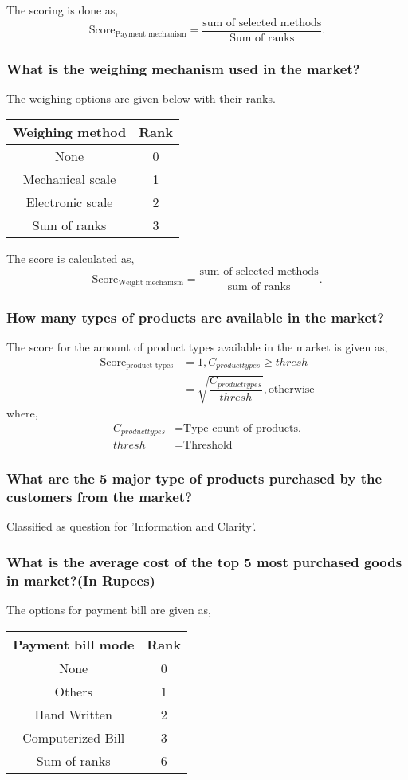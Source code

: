 \documentclass[oneside,twocolumn]{article}
\newcommand{\tsub}[2]{\text{#1}_{\text{#2}}}
\newenvironment{ttable}
               {\begin{center}
                 \begin{tabular}{c|c}
                   \hline
                   }
                   { \\ \hline
                 \end{tabular}
               \end{center}
               }
\begin{document}
The scoring is done as,
\[
\text{Score}_{\text{Payment mechanism}} = \dfrac{\text{sum of selected methods}}{\text{Sum of ranks}}.
\]

\subsubsection{What is the weighing mechanism used in the market?}
The weighing options are given below with their ranks.
\begin{center}
  \begin{tabular}{c|c}
    \hline
    Weighing method & Rank \\ \hline
    None & 0 \\
    Mechanical scale & 1 \\
    Electronic scale & 2 \\ \hline
    Sum of ranks & 3 \\ \hline
  \end{tabular}
\end{center}

The score is calculated as,
\[
\text{Score}_{\text{Weight mechanism}} = \dfrac{\text{sum of selected methods}}{\text{sum of ranks}}.
\]

\subsubsection{How many types of products are available in the market?}
The score for the amount of product types available in the market is
given as,
\begin{align*}
  \tsub{Score}{product types} &= 1, C_{product types} \ge thresh \\
  &= \sqrt{\dfrac{C_{product types}}{thresh}}, \text{otherwise}
\end{align*}
where,
\begin{align*}
  C_{product types} &= \text{Type count of products.} \\
  thresh &= \text{Threshold}
\end{align*}

\subsubsection{What are the 5 major type of products purchased by the customers from the market?}
Classified as question for 'Information and Clarity'.

\subsubsection{What is the average cost of the top 5 most purchased goods in market?(In Rupees)}
The options for payment bill are given as,
\begin{ttable}
  Payment bill mode & Rank \\ \hline
  None & 0 \\
  Others & 1 \\
  Hand Written & 2 \\
  Computerized Bill & 3 \\ \hline
  Sum of ranks & 6
\end{ttable}
\end{document}
